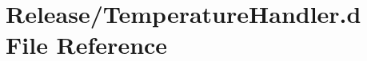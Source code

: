 \hypertarget{_temperature_handler_8d}{}\section{Release/\+Temperature\+Handler.d File Reference}
\label{_temperature_handler_8d}
